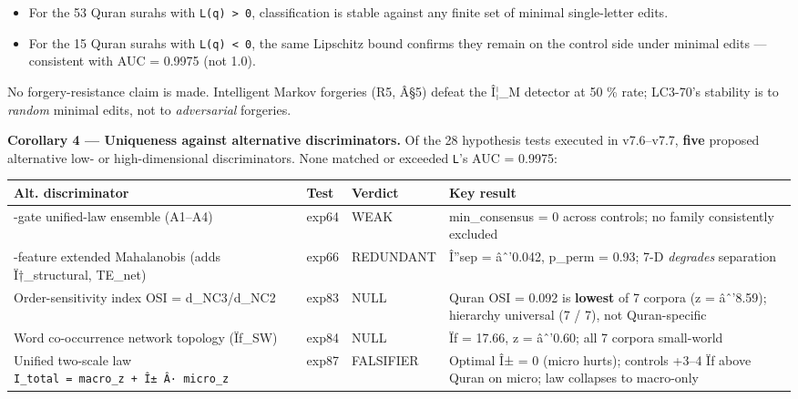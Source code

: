 \documentclass[
]{article}
\newcounter{none} %
\providecommand{\tightlist}{%
  \setlength{\itemsep}{0pt}\setlength{\parskip}{0pt}}
\begin{document}
\begin{itemize}
\tightlist
\item
  For the 53 Quran surahs with \texttt{L(q)\ \textgreater{}\ 0},
  classification is stable against any finite set of minimal
  single-letter edits.
\item
  For the 15 Quran surahs with \texttt{L(q)\ \textless{}\ 0}, the same
  Lipschitz bound confirms they remain on the control side under minimal
  edits --- consistent with AUC = 0.9975 (not 1.0).
\end{itemize}

No forgery-resistance claim is made. Intelligent Markov forgeries (R5,
Â§5) defeat the Î¦\_M detector at 50 \% rate; LC3-70's stability is to
\emph{random} minimal edits, not to \emph{adversarial} forgeries.

\textbf{Corollary 4 --- Uniqueness against alternative discriminators.}
Of the 28 hypothesis tests executed in v7.6--v7.7, \textbf{five}
proposed alternative low- or high-dimensional discriminators. None
matched or exceeded \texttt{L}'s AUC = 0.9975:

{\def\LTcaptype{none} %
\begin{longtable}[]{@{}
  >{\raggedright\arraybackslash}p{}
  >{\raggedright\arraybackslash}p{}
  >{\raggedright\arraybackslash}p{}
  >{\raggedright\arraybackslash}p{}@{}}
\toprule\noalign{}
\begin{minipage}[b]{\linewidth}\raggedright
Alt. discriminator
\end{minipage} & \begin{minipage}[b]{\linewidth}\raggedright
Test
\end{minipage} & \begin{minipage}[b]{\linewidth}\raggedright
Verdict
\end{minipage} & \begin{minipage}[b]{\linewidth}\raggedright
Key result
\end{minipage} \\
\midrule\noalign{}
\endhead
\bottomrule\noalign{}
\endlastfoot
5-gate unified-law ensemble (A1--A4) & exp64 & WEAK & min\_consensus = 0
across controls; no family consistently excluded \\
7-feature extended Mahalanobis (adds Ï†\_structural, TE\_net) & exp66 &
REDUNDANT & Î''sep = âˆ'0.042, p\_perm = 0.93; 7-D \emph{degrades}
separation \\
Order-sensitivity index OSI = d\_NC3/d\_NC2 & exp83 & NULL & Quran OSI =
0.092 is \textbf{lowest} of 7 corpora (z = âˆ'8.59); hierarchy universal
(7 / 7), not Quran-specific \\
Word co-occurrence network topology (Ïƒ\_SW) & exp84 & NULL & Ïƒ =
17.66, z = âˆ'0.60; all 7 corpora small-world \\
Unified two-scale law
\texttt{I\_total\ =\ macro\_z\ +\ Î±\ Â·\ micro\_z} & exp87 & FALSIFIER
& Optimal Î± = 0 (micro hurts); controls +3--4 Ïƒ above Quran on micro;
law collapses to macro-only \\
\end{longtable}
}
\end{document}
